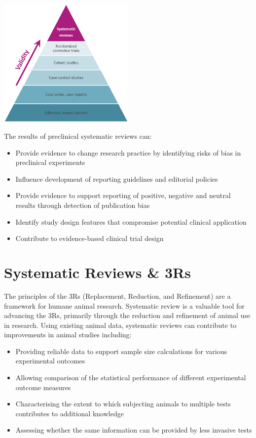 \documentclass[
]{book}
\providecommand{\tightlist}{%
  \setlength{\itemsep}{0pt}\setlength{\parskip}{0pt}}
\begin{document}
\includegraphics[width=0.5\textwidth,height=0.5\textheight]{figs/evidence-triangle.png}

The results of preclinical systematic reviews can:

\begin{itemize}
\tightlist
\item
  Provide evidence to change research practice by identifying risks of bias in preclinical experiments
\item
  Influence development of reporting guidelines and editorial policies
\item
  Provide evidence to support reporting of positive, negative and neutral results through detection of publication bias
\item
  Identify study design features that compromise potential clinical application
\item
  Contribute to evidence-based clinical trial design
\end{itemize}

\hypertarget{srs-3rs}{%
\chapter{Systematic Reviews \& 3Rs}\label{srs-3rs}}

The principles of the 3Rs (Replacement, Reduction, and Refinement) are a framework for humane animal research. Systematic review is a valuable tool for advancing the 3Rs, primarily through the reduction and refinement of animal use in research. Using existing animal data, systematic reviews can contribute to improvements in animal studies including:

\begin{itemize}
\tightlist
\item
  Providing reliable data to support sample size calculations for various experimental outcomes
\item
  Allowing comparison of the statistical performance of different experimental outcome measures
\item
  Characterising the extent to which subjecting animals to multiple tests contributes to additional knowledge
\item
  Assessing whether the same information can be provided by less invasive tests
\end{itemize}
\end{document}
